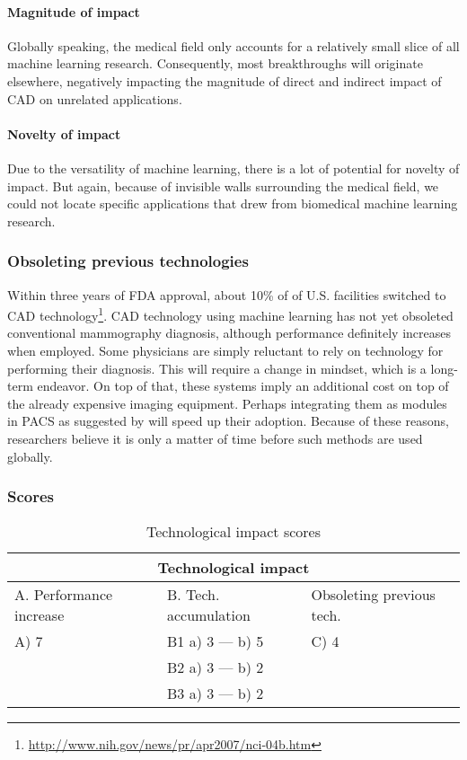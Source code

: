 \paragraph{Magnitude of impact}
Globally speaking, the medical field only accounts for a relatively small slice
of all machine learning research. Consequently, most breakthroughs will
originate elsewhere, negatively impacting the magnitude of direct and
indirect impact of CAD on unrelated applications.

\paragraph{Novelty of impact}
Due to the versatility of machine learning, there is a lot of potential
for novelty of impact. But again, because of invisible walls surrounding the
medical field, we could not locate specific applications that drew from
biomedical machine learning research.

\subsubsection{Obsoleting previous technologies}
Within three years of FDA approval, about 10\% of of U.S. facilities switched to
CAD technology\footnote{\url{http://www.nih.gov/news/pr/apr2007/nci-04b.htm}}.
CAD technology using machine learning has not yet obsoleted conventional
mammography diagnosis, although performance definitely increases when employed.
Some physicians are simply reluctant to rely on technology for performing their
diagnosis. This will require a change in mindset, which is a long-term endeavor.
On top of that, these systems imply an additional cost on top of the already
expensive imaging equipment. Perhaps integrating them as modules in PACS as
suggested by \cite{cadhistory} will speed up their adoption. Because of these
reasons, researchers believe it is only a matter of time before such methods are
used globally.

\subsubsection{Scores}
\begin{table}[h]
\centering
\begin{tabular}{l l l}
\hline
\multicolumn{3}{|c|}{Technological impact} \\
\hline
A. Performance increase & B. Tech. accumulation & Obsoleting previous tech.\\
A) 7 & B1 a) 3 --- b) 5 & C) 4\\ 
     & B2 a) 3 --- b) 2 & \\
     & B3 a) 3 --- b) 2 & \\
\hline
\end{tabular}
\caption{Technological impact scores}
\label{tbl:impactscores5}
\end{table}